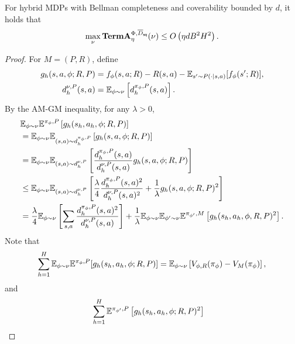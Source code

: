 \begin{lemma}\label{lem: bound Pcomp cover}
For hybrid MDPs with Bellman completeness and coverability bounded by $d$, it holds that 
\begin{align*}
    \max_\nu \textbf{\textup{TermA}}^{\Phi, \overline{D}_{\mathsf{sq}}}_\eta(\nu) \le O\left(\eta d B^2 H^2\right). 
\end{align*}
\end{lemma}

\begin{proof}
    For $M=(P,R)$, define 
    \begin{align*}
        g_h(s,a, \phi; R, P)  &= f_{\phi}(s,a; R) - R(s,a) - \mathbb{E}_{s'\sim P(\cdot|s,a)}[f_{\phi}(s'; R)], \\
        d_h^{\nu, P}(s,a) &= \mathbb{E}_{\phi\sim \nu}\left[d_h^{\pi_\phi, P}(s,a) \right]. 
    \end{align*}
    By the AM-GM inequality, for any $\lambda>0$, 
     \begin{align}
        &\mathbb{E}_{\phi\sim \nu} \mathbb{E}^{\pi_\phi, P} \left[g_h(s_h,a_h, \phi; R,P)\right] \nonumber
        \\&= \mathbb{E}_{\phi\sim \nu} \mathbb{E}_{(s,a)\sim d_h^{\pi_\phi, P}} \left[g_h(s,a, \phi; R,P)\right]  \nonumber \\
        &= \mathbb{E}_{\phi\sim \nu} \mathbb{E}_{(s,a)\sim d_h^{\nu, P}} \left[ \frac{d_h^{\pi_\phi, P}(s,a)}{d_h^{\nu, P}(s,a)} g_h(s,a, \phi; R,P)\right]  \nonumber \\
        &\leq  \mathbb{E}_{\phi\sim \nu} \mathbb{E}_{(s,a)\sim d_h^{\nu, P}} \left[ \frac{\lambda}{4}\frac{d_h^{\pi_\phi, P}(s,a)^2}{d_h^{\nu, P}(s,a)^2} + \frac{1}{\lambda}g_h(s,a, \phi; R,P)^2\right]  \nonumber \\
        &= \frac{\lambda}{4} \mathbb{E}_{\phi\sim \nu}  \left[\sum_{s,a} \frac{d_h^{\pi_\phi, P}(s,a)^2}{d_h^{\nu, P}(s,a)}\right] + \frac{1}{\lambda}\mathbb{E}_{\phi\sim \nu} \mathbb{E}_{\phi'\sim \nu}\mathbb{E}^{\pi_{\phi'}, M}\left[g_h(s_h,a_h, \phi, R,P)^2\right].  \label{eq:cov_start}
    \end{align}
    Note that 
    \begin{align*}
        \sum_{h=1}^H \mathbb{E}_{\phi\sim \nu} \mathbb{E}^{\pi_\phi, P} [g_h(s_h,a_h, \phi; R,P)] = \mathbb{E}_{\phi\sim \nu} \left[ V_{\phi, R}(\pi_\phi) - V_M(\pi_\phi) \right],  
    \end{align*}
    and 
    \begin{align*}
       &\sum_{h=1}^H \E^{\pi_{\phi'}, P}\left[g_h(s_h,a_h, \phi; R,P)^2\right]

\end{align*}
\end{proof}
